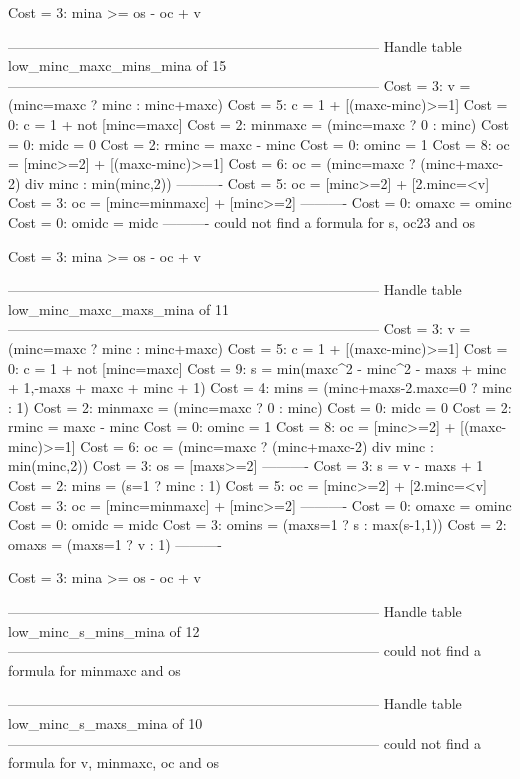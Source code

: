 Cost =  3:  mina >= os - oc + v

--------------------------------------------------------------------------------
Handle table low_minc_maxc_mins_mina of 15
--------------------------------------------------------------------------------
Cost =  3:  v       = (minc=maxc ? minc : minc+maxc)
Cost =  5:  c       = 1 + [(maxc-minc)>=1]
Cost =  0:  c       = 1 + not [minc=maxc]
Cost =  2:  minmaxc = (minc=maxc ? 0 : minc)
Cost =  0:  midc    = 0
Cost =  2:  rminc   = maxc - minc
Cost =  0:  ominc   = 1
Cost =  8:  oc      = [minc>=2] + [(maxc-minc)>=1]
Cost =  6:  oc      = (minc=maxc ? (minc+maxc-2) div minc : min(minc,2))
----------
Cost =  5:  oc      = [minc>=2] + [2.minc=<v]
Cost =  3:  oc      = [minc=minmaxc] + [minc>=2]
----------
Cost =  0:  omaxc   = ominc
Cost =  0:  omidc   = midc
----------
could not find a formula for s, oc23 and os

Cost =  3:  mina >= os - oc + v

--------------------------------------------------------------------------------
Handle table low_minc_maxc_maxs_mina of 11
--------------------------------------------------------------------------------
Cost =  3:  v       = (minc=maxc ? minc : minc+maxc)
Cost =  5:  c       = 1 + [(maxc-minc)>=1]
Cost =  0:  c       = 1 + not [minc=maxc]
Cost =  9:  s       = min(maxc^2 - minc^2 - maxs + minc + 1,-maxs + maxc + minc + 1)
Cost =  4:  mins    = (minc+maxs-2.maxc=0 ? minc : 1)
Cost =  2:  minmaxc = (minc=maxc ? 0 : minc)
Cost =  0:  midc    = 0
Cost =  2:  rminc   = maxc - minc
Cost =  0:  ominc   = 1
Cost =  8:  oc      = [minc>=2] + [(maxc-minc)>=1]
Cost =  6:  oc      = (minc=maxc ? (minc+maxc-2) div minc : min(minc,2))
Cost =  3:  os      = [maxs>=2]
----------
Cost =  3:  s       = v - maxs + 1
Cost =  2:  mins    = (s=1 ? minc : 1)
Cost =  5:  oc      = [minc>=2] + [2.minc=<v]
Cost =  3:  oc      = [minc=minmaxc] + [minc>=2]
----------
Cost =  0:  omaxc   = ominc
Cost =  0:  omidc   = midc
Cost =  3:  omins   = (maxs=1 ? s : max(s-1,1))
Cost =  2:  omaxs   = (maxs=1 ? v : 1)
----------

Cost =  3:  mina >= os - oc + v

--------------------------------------------------------------------------------
Handle table low_minc_s_mins_mina of 12
--------------------------------------------------------------------------------
could not find a formula for minmaxc and os


--------------------------------------------------------------------------------
Handle table low_minc_s_maxs_mina of 10
--------------------------------------------------------------------------------
could not find a formula for v, minmaxc, oc and os

